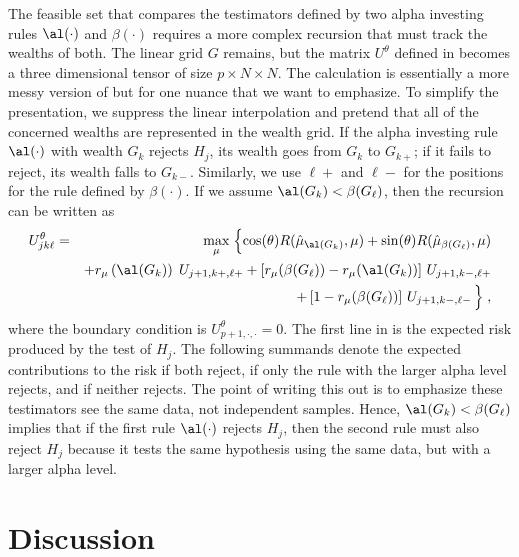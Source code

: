 \documentclass{gSCS2e}
\begin{document}
 The feasible set that compares the testimators defined by two alpha investing
 rules $\al(\cdot)$ and $\beta(\cdot)$ requires a more complex recursion that
 must track the wealths of both.  The linear grid $G$ remains, but the matrix
 $U^\theta$ defined in  becomes a three dimensional tensor of size
 $p \times N \times N$.  The calculation is essentially a more messy version of
  but for one nuance that we want to emphasize.  To simplify the
 presentation, we suppress the linear interpolation and pretend that all of the
 concerned wealths are represented in the wealth grid.  If the alpha investing
 rule $\al(\cdot)$ with wealth $G_k$ rejects $H_j$, its wealth goes from $G_k$
 to $G_{k+}$; if it fails to reject, its wealth falls to $G_{k-}$.  Similarly,
 we use $\ell+$ and $\ell-$ for the positions for the rule defined by
 $\beta(\cdot)$.  If we assume $\al(G_k) < \beta(G_\ell)$, then the recursion
 can be written as
 \begin{eqnarray}
   U^\theta_{jk\ell} &=&  \max_\mu \;\Bigl\{
     \cos(\theta) R(\hat\mu_{\al(G_k)}, \mu) 
       + \sin(\theta) R(\hat\mu_{\beta(G_\ell)},\mu) \cr
     & & + r_\mu\left(\al(G_k)\right) \; U_{j+1,k+,\ell+} 
         + \left[ r_\mu(\beta(G_\ell)) - r_\mu(\al(G_k)) \right] \, U_{j+1,k-,\ell+} \cr
     & & + \left[1-r_\mu(\beta(G_\ell))\right] \, U_{j+1,k-,\ell-} \, \Bigr\}\;,
 \label{eq:Ujkl}
 \end{eqnarray}
 where the boundary condition is $U_{p+1,\cdot,\cdot}^\theta= 0$.  The first
 line in  is the expected risk produced by the test of $H_j$.
 The following summands denote the expected contributions to the risk if both
 reject, if only the rule with the larger alpha level rejects, and if neither
 rejects.  The point of writing this out is to emphasize these testimators see
 the same data, not independent samples.  Hence, $\al(G_k) < \beta(G_\ell)$
 implies that if the first rule $\al(\cdot)$ rejects $H_j$, then the second rule
 must also reject $H_j$ because it tests the same hypothesis using the same
 data, but with a larger alpha level.


\section{ Discussion }
\end{document}
